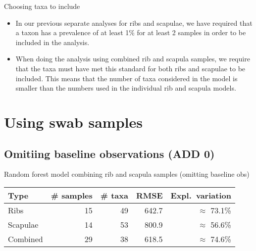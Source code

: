 \documentclass{beamer}
\begin{document}
\begin{frame}{Choosing taxa to include}
  
  \begin{itemize}
    \item In our previous separate analyses for ribs and scapulae, we have
    required that a taxon has a prevalence of at least 1\%  for at least 2
    samples in order to be included in the analysis.
    \item When doing the analysis using combined rib and scapula samples, we
    require that the taxa must have met this standard for both ribs and scapulae to be
    included.  This means that the number of taxa considered in the model is
    smaller than the numbers used in the individual rib and scapula models.
  \end{itemize}

\end{frame}



\section{Using swab samples}


\subsection{Omitiing baseline observations (ADD 0)}

\begin{frame}{Random forest model combining rib and scapula samples (omitting baseline obs)}

  \begin{tabular}{lrrrr}
    Type & \# samples & \# taxa & RMSE & Expl.\ variation\\ \hline
    Ribs & 15 & 49 & 642.7 & $\approx$ 73.1\% \\
    Scapulae & 14 & 53 & 800.9 &  $\approx$ 56.6\% \\
    Combined & 29 & 38 & 618.5 &  $\approx$ 74.6\%
  \end{tabular}
  
  \vspace{0.1in}

\end{frame}
\end{document}
